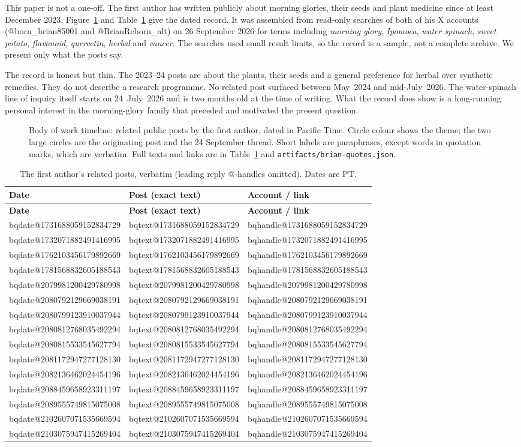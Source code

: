 \documentclass[11pt,a4paper]{article}
\makeatletter
\newcommand{\BQtext}[1]{\csname bqtext@#1\endcsname}
\newcommand{\TLrow}[1]{\csname bqdate@#1\endcsname & \BQtext{#1} & \csname bqhandle@#1\endcsname\newline {\scriptsize\csname bqurl@#1\endcsname}\\}
\makeatother
\begin{document}
This paper is not a one-off. The first author has written publicly about morning glories, their seeds and plant medicine since at least December 2023. Figure~\ref{fig:timeline} and Table~\ref{tab:timeline} give the dated record. It was assembled from read-only searches of both of his X accounts (@born\_brian85001 and @BrianReborn\_alt) on 26 September 2026 for terms including \emph{morning glory}, \emph{Ipomoea}, \emph{water spinach}, \emph{sweet potato}, \emph{flavonoid}, \emph{quercetin}, \emph{herbal} and \emph{cancer}. The searches used small result limits, so the record is a sample, not a complete archive. We present only what the posts say.

The record is honest but thin. The 2023--24 posts are about the plants, their seeds and a general preference for herbal over synthetic remedies. They do not describe a research programme. No related post surfaced between May~2024 and mid-July~2026. The water-spinach line of inquiry itself starts on 24~July~2026 and is two months old at the time of writing. What the record does show is a long-running personal interest in the morning-glory family that preceded and motivated the present question.

\begin{figure}[H]
\centering
\begin{adjustbox}{max width=\linewidth}\end{adjustbox}
\caption{Body of work timeline: related public posts by the first author, dated in Pacific Time. Circle colour shows the theme; the two large circles are the originating post and the 24 September thread. Short labels are paraphrases, except words in quotation marks, which are verbatim. Full texts and links are in Table~\ref{tab:timeline} and \texttt{artifacts/brian-quotes.json}.}
\label{fig:timeline}
\end{figure}

{\small
\renewcommand{\arraystretch}{1.25}
\begin{longtable}{@{}>{\raggedright\arraybackslash}p{1.7cm} >{\raggedright\arraybackslash}p{9.3cm} >{\raggedright\arraybackslash}p{4.1cm}@{}}
\caption{The first author's related posts, verbatim (leading reply @-handles omitted). Dates are PT.}\label{tab:timeline}\\
\toprule
\textbf{Date} & \textbf{Post (exact text)} & \textbf{Account / link}\\
\midrule\endfirsthead
\toprule
\textbf{Date} & \textbf{Post (exact text)} & \textbf{Account / link}\\
\midrule\endhead
\bottomrule\endfoot
\TLrow{1731688059152834729}
\TLrow{1732071882491416995}
\TLrow{1762103456179892669}
\TLrow{1781568832605188543}
\TLrow{2079981200429780998}
\TLrow{2080792129669038191}
\TLrow{2080799123910037944}
\TLrow{2080812768035492294}
\TLrow{2080815533545627794}
\TLrow{2081172947277128130}
\TLrow{2082136462024454196}
\TLrow{2088459658923311197}
\TLrow{2089555749815075008}
\TLrow{2102607071535669594}
\TLrow{2103075947415269404}
\end{longtable}
}
\end{document}
